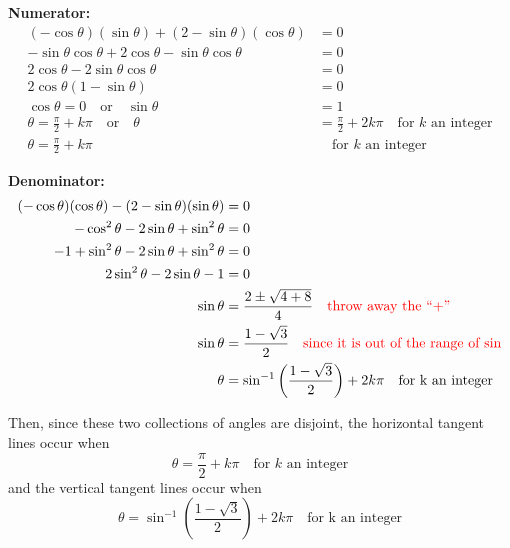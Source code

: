 \documentclass[]{ximera}
\begin{document}
\begin{problem}
\begin{freeResponse}
	{\bf Numerator:}
		\begin{align*}
		(- \cos \theta)(\sin \theta) + (2 - \sin \theta)(\cos \theta) &= 0  \\
		- \sin \theta \cos \theta + 2 \cos \theta - \sin \theta \cos \theta &= 0  \\
		2 \cos \theta - 2 \sin \theta \cos \theta &= 0  \\
		2 \cos \theta (1 - \sin \theta) &= 0  \\
		\cos \theta = 0 \quad \text{or} \quad \sin \theta &= 1  \\
		\theta = \frac{\pi}{2} + k \pi  \quad  \text{or}  \quad  \theta &= \frac{\pi}{2} + 2k\pi \quad \text{for } k \text{ an integer}  \\
		\theta = \frac{\pi}{2} + k \pi  &\quad \text{for } k \text{ an integer}
		\end{align*}
		
	{\bf Denominator:}
		\begin{align*}
		(-\cos \theta)(\cos \theta) - (2 - \sin \theta)(\sin \theta) &= 0  \\
		- \cos^2 \theta - 2 \sin \theta + \sin^2 \theta &= 0  \\
		-1 + \sin^2 \theta - 2 \sin \theta + \sin^2 \theta &= 0  \\
		2 \sin^2 \theta - 2 \sin \theta - 1 &= 0  \\
		\sin \theta &= \frac{2 \pm \sqrt{4 + 8}}{4}  	\quad  {\color{red}\text{throw away the ``+'' }}\\
		\sin \theta &= \frac{1 - \sqrt{3}}{2}  \quad {\color{red}\text{since it is out of the range of sin}}\\
		\theta &= \sin^{-1} \left( \frac{1-\sqrt{3}}{2} \right) + 2 k \pi 	\quad \text{for k an integer}
		\end{align*}
		
	Then, since these two collections of angles are disjoint, the horizontal tangent lines occur when
		\[
		\boxed{\theta = \frac{\pi}{2} + k \pi}  \quad \text{for } k \text{ an integer}
		\]
	and the vertical tangent lines occur when
		\[
		\boxed{\theta = \sin^{-1} \left( \frac{1-\sqrt{3}}{2} \right) + 2 k \pi} 	\quad \text{for k an integer}
		\]
	\end{freeResponse}
	
\end{problem}

\begin{instructorNotes}

\end{instructorNotes}
\end{document}
